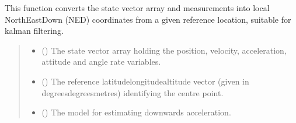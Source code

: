 \documentclass[letterpaper,10pt,english]{sphinxmanual}
\begin{document}

\begin{fulllineitems}
\label{\detokenize{modules/fusion/kalman:qnav.fusion.kalman.state_vector2ned}}
\pysigstartsignatures
{}
\pysigstopsignatures
\sphinxAtStartPar
This function converts the state vector array and measurements into local
North\sphinxhyphen{}East\sphinxhyphen{}Down (NED) coordinates from a given reference location,
suitable for kalman filtering.
\begin{quote}\begin{description}
\begin{itemize}
\item {} 
\sphinxAtStartPar
{} (\sphinxstyleliteralemphasis{\sphinxupquote{ (}}\sphinxstyleliteralemphasis{\sphinxupquote{)}}) \textendash{} The state vector array holding the position,
velocity, acceleration, attitude and angle rate variables.

\item {} 
\sphinxAtStartPar
{} (\sphinxstyleliteralemphasis{\sphinxupquote{ (}}\sphinxstyleliteralemphasis{\sphinxupquote{)}}) \textendash{} The reference latitude\sphinxhyphen{}longitude\sphinxhyphen{}altitude vector (given in
degrees\sphinxhyphen{}degrees\sphinxhyphen{}metres) identifying the centre point.

\item {} 
\sphinxAtStartPar
{} ({\hyperref[\detokenize{modules/gravity/base:qnav.gravity.base.GravityModel}]{}}) \textendash{} The model for estimating downwards acceleration.


\end{itemize}
\end{description}
\end{quote}
\end{fulllineitems}
\end{document}
